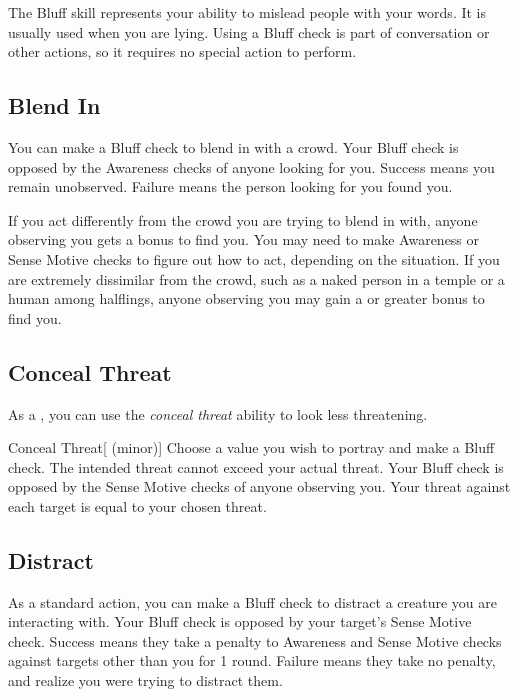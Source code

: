 \newpage
{}
        The Bluff skill represents your ability to mislead people with your words. It is usually used when you are lying. Using a Bluff check is part of conversation or other actions, so it requires no special action to perform.

    \subsection{Blend In}
        You can make a Bluff check to blend in with a crowd. Your Bluff check is opposed by the Awareness checks of anyone looking for you. Success means you remain unobserved. Failure means the person looking for you found you.

        If you act differently from the crowd you are trying to blend in with, anyone observing you gets a  bonus to find you. You may need to make Awareness or Sense Motive checks to figure out how to act, depending on the situation. If you are extremely dissimilar from the crowd, such as a naked person in a temple or a human among halflings, anyone observing you may gain a  or greater bonus to find you.

    \subsection{Conceal Threat}\label{Conceal Threat}
        As a , you can use the \textit{conceal threat} ability to look less threatening.
        \begin{ability}{Conceal Threat}[ (minor)]
            Choose a  value you wish to portray and make a Bluff check.
            The intended threat cannot exceed your actual threat.
            Your Bluff check is opposed by the Sense Motive checks of anyone observing you.
            \hit Your threat against each target is equal to your chosen threat.
        \end{ability}

    \subsection{Distract}\label{Distract}
        As a standard action, you can make a Bluff check to distract a creature you are interacting with.
        Your Bluff check is opposed by your target's Sense Motive check.
        Success means they take a  penalty to Awareness and Sense Motive checks against targets other than you for 1 round.
        Failure means they take no penalty, and realize you were trying to distract them.

